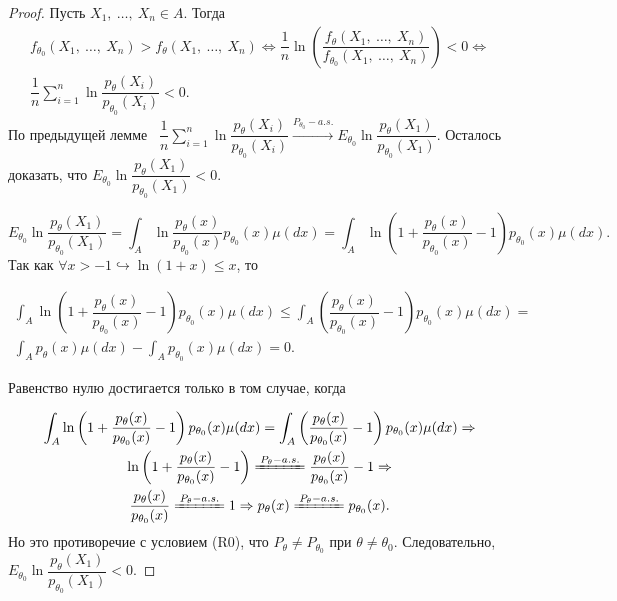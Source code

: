 \begin{proof}
    Пусть $\displaystyle X_{1} ,\ \dotsc ,\ X_{n} \in A$. Тогда
    \begin{gather*}
        f_{\theta _{0}}( X_{1} ,\ \dotsc ,\ X_{n})  >f_{\theta }( X_{1} ,\ \dotsc ,\ X_{n}) \Leftrightarrow \dfrac{1}{n}\ln\left(\dfrac{f_{\theta }( X_{1} ,\ \dotsc ,\ X_{n})}{f_{\theta _{0}}( X_{1} ,\ \dotsc ,\ X_{n})}\right) < 0\Leftrightarrow \\
        \dfrac{1}{n}\sum _{i=1}^{n}\ln\dfrac{p_{\theta }( X_{i})}{p_{\theta _{0}}( X_{i})} < 0.
    \end{gather*}
    По предыдущей лемме \ $\displaystyle \dfrac{1}{n}\sum _{i=1}^{n}\ln\dfrac{p_{\theta }( X_{i})}{p_{\theta _{0}}( X_{i})}\xrightarrow{P_{\theta_0 } -a.s.} E_{\theta _{0}}\ln\dfrac{p_{\theta }( X_{1})}{p_{\theta _{0}}( X_{1})}$. Осталось доказать, что $\displaystyle E_{\theta _{0}}\ln\dfrac{p_{\theta }( X_{1})}{p_{\theta _{0}}( X_{1})} < 0$.
    
    
    \begin{equation*}
        E_{\theta _{0}}\ln\dfrac{p_{\theta }( X_{1})}{p_{\theta _{0}}( X_{1})} =\int _{A}\ln\dfrac{p_{\theta }( x)}{p_{\theta _{0}}( x)} p_{\theta _{0}}( x) \mu ( dx) =\int _{A}\ln\left( 1+\dfrac{p_{\theta }( x)}{p_{\theta _{0}}( x)} -1\right) p_{\theta _{0}}( x) \mu ( dx) .
    \end{equation*}
    Так как $\displaystyle \forall x >-1\hookrightarrow \ln( 1+x) \leqslant x$, то
    
    
    \begin{gather*}
        \int _{A}\ln\left( 1+\dfrac{p_{\theta }( x)}{p_{\theta _{0}}( x)} -1\right) p_{\theta _{0}}( x) \mu ( dx) \leqslant \int _{A}\left(\dfrac{p_{\theta }( x)}{p_{\theta _{0}}( x)} -1\right) p_{\theta _{0}}( x) \mu ( dx) =\\
        \int _{A} p_{\theta }( x) \mu ( dx) -\int _{A} p_{\theta _{0}}( x) \mu ( dx) =0.
    \end{gather*}
    
    
    Равенство нулю достигается только в том случае, когда 
    
    
    \begin{gather*}
        \int _{A}\ln\left( 1+\dfrac{p_{\theta }( x)}{p_{\theta _{0}}( x)} -1\right) p_{\theta _{0}}( x) \mu ( dx) =\int _{A}\left(\dfrac{p_{\theta }( x)}{p_{\theta _{0}}( x)} -1\right) p_{\theta _{0}}( x) \mu ( dx) \Rightarrow \\
        \ln\left( 1+\dfrac{p_{\theta }( x)}{p_{\theta _{0}}( x)} -1\right)\xlongequal{P_{\theta } -a.s.}\dfrac{p_{\theta }( x)}{p_{\theta _{0}}( x)} -1\Rightarrow \\
        \dfrac{p_{\theta }( x)}{p_{\theta _{0}}( x)}\xlongequal{P_{\theta } -a.s.} 1\Rightarrow p_{\theta }( x)\xlongequal{P_{\theta } -a.s.} p_{\theta _{0}}( x) .
    \end{gather*}
    Но это противоречие с условием (R0), что $\displaystyle P_{\theta } \neq P_{\theta _{0}}$ при $\displaystyle \theta \neq \theta _{0}$. Следовательно, $\displaystyle E_{\theta _{0}}\ln\dfrac{p_{\theta }( X_{1})}{p_{\theta _{0}}( X_{1})} < 0$.
\end{proof}
